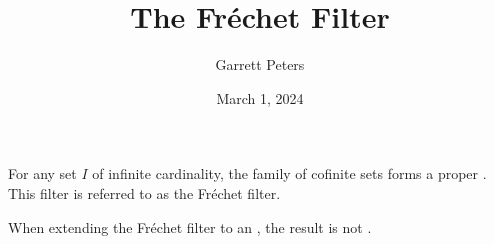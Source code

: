 \documentclass[a4paper]{article}
\title{The Fréchet Filter}
\date{March 1, 2024}
\author{Garrett Peters}
\begin{document}
\maketitle
\par{For any set \(I\) of infinite cardinality, the family of cofinite sets forms a proper . This filter is referred to as the Fréchet filter.}\par{When extending the Fréchet filter to an , the result is not .}
\printbibliography
\end{document}
